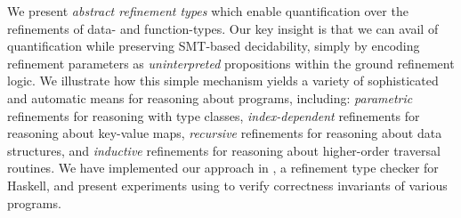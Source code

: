 We present \emph{abstract refinement types} which enable 
quantification over the refinements of data- and 
function-types. Our key insight is that we 
can avail of quantification while preserving SMT-based 
decidability, simply by encoding refinement parameters
as \emph{uninterpreted} propositions within the ground 
refinement logic.
%
We illustrate how this simple mechanism yields a variety 
of sophisticated and automatic means for reasoning about 
programs, including:
\emph{parametric} refinements for reasoning with type classes,
\emph{index-dependent} refinements for reasoning about key-value maps,
\emph{recursive} refinements for reasoning about data structures, and
\emph{inductive} refinements for reasoning about higher-order traversal routines.
%
We have implemented our approach in \toolname, a refinement
type checker for Haskell, and present experiments using
\toolname to verify correctness invariants of various programs.
